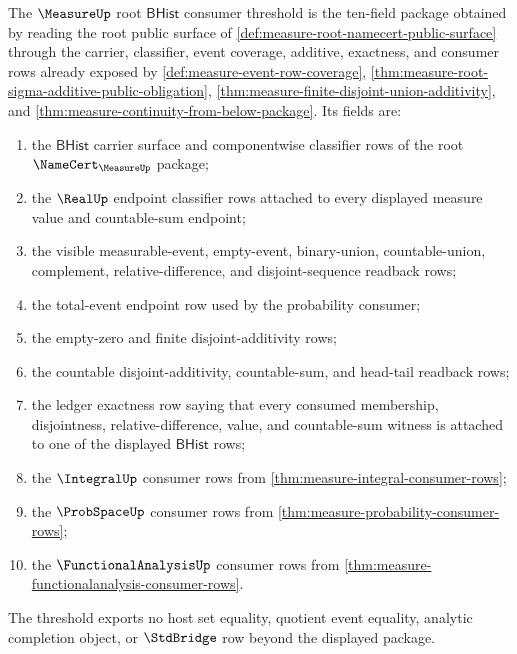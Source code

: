 \begin{definition}
\label{def:measure-root-bhist-consumer-threshold}
The $\MeasureUp$ root $\mathsf{BHist}$ consumer threshold is the ten-field
package obtained by reading the root public surface of
\autoref{def:measure-root-namecert-public-surface} through the carrier,
classifier, event coverage, additive, exactness, and consumer rows already
exposed by \autoref{def:measure-event-row-coverage},
\autoref{thm:measure-root-sigma-additive-public-obligation},
\autoref{thm:measure-finite-disjoint-union-additivity}, and
\autoref{thm:measure-continuity-from-below-package}. Its fields are:
\begin{enumerate}
  \item the $\mathsf{BHist}$ carrier surface and componentwise classifier rows
  of the root $\NameCert_{\MeasureUp}$ package;
  \item the $\RealUp$ endpoint classifier rows attached to every displayed
  measure value and countable-sum endpoint;
  \item the visible measurable-event, empty-event, binary-union,
  countable-union, complement, relative-difference, and disjoint-sequence
  readback rows;
  \item the total-event endpoint row used by the probability consumer;
  \item the empty-zero and finite disjoint-additivity rows;
  \item the countable disjoint-additivity, countable-sum, and head-tail
  readback rows;
  \item the ledger exactness row saying that every consumed membership,
  disjointness, relative-difference, value, and countable-sum witness is
  attached to one of the displayed $\mathsf{BHist}$ rows;
  \item the $\IntegralUp$ consumer rows from
  \autoref{thm:measure-integral-consumer-rows};
  \item the $\ProbSpaceUp$ consumer rows from
  \autoref{thm:measure-probability-consumer-rows};
  \item the $\FunctionalAnalysisUp$ consumer rows from
  \autoref{thm:measure-functionalanalysis-consumer-rows}.
\end{enumerate}
The threshold exports no host set equality, quotient event equality, analytic
completion object, or $\StdBridge$ row beyond the displayed package.
\end{definition}

